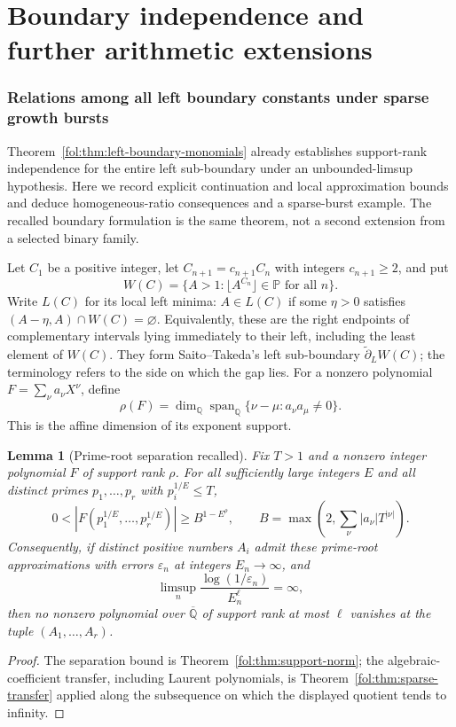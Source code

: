 \documentclass[11pt,a4paper]{article}
\newtheorem{lemma}[theorem]{Lemma}
\theoremstyle{definition}
\theoremstyle{remark}
\numberwithin{equation}{section}
\begin{document}
\part{Boundary independence and further arithmetic extensions}
\label{part:extensions}

\section{Relations among all left boundary constants under sparse growth bursts}
\label{f13:bdsup:section}

Theorem~\ref{fol:thm:left-boundary-monomials} already establishes
support-rank independence for the entire left sub-boundary under an
unbounded-limsup hypothesis. Here we record explicit continuation and
local approximation bounds and deduce homogeneous-ratio consequences
and a sparse-burst example. The recalled boundary formulation is the
same theorem, not a second extension from a selected binary family.

Let $C_1$ be a positive integer, let
$C_{n+1}=c_{n+1}C_n$ with integers $c_{n+1}\ge2$, and put
\[
 W(C)=\{A>1:\lfloor A^{C_n}\rfloor\in\mathbb P\text{ for all }n\}.
\]
Write $L(C)$ for its local left minima: $A\in L(C)$ if some $\eta>0$
satisfies $(A-\eta,A)\cap W(C)=\varnothing$. Equivalently, these are the right endpoints of complementary intervals
lying immediately to their left, including the least element of
$W(C)$. They form Saito--Takeda's left sub-boundary
$\widetilde\partial_L W(C)$; the terminology refers to the side on
which the gap lies.
For a nonzero polynomial $F=\sum_\nu a_\nu X^\nu$, define
\[
 \rho(F)=\dim_{\mathbb Q}\operatorname{span}_{\mathbb Q}
    \{\nu-\mu:a_\nu a_\mu\ne0\}.
\]
This is the affine dimension of its exponent support.

\begin{lemma}[Prime-root separation recalled]\label{f13:bdsup:separation}
Fix $T>1$ and a nonzero integer polynomial $F$ of support rank $\rho$.
For all sufficiently large integers $E$ and all distinct primes
$p_1,\ldots,p_r$ with $p_i^{1/E}\le T$,
\[
 0<|F(p_1^{1/E},\ldots,p_r^{1/E})|
 \ge B^{1-E^\rho},\qquad
 B=\max\left(2,\sum_\nu |a_\nu|T^{|\nu|}\right).
\]
Consequently, if distinct positive numbers $A_i$ admit these prime-root
approximations with errors $\varepsilon_n$ at integers $E_n\to\infty$,
and
\[
 \limsup_n \frac{\log(1/\varepsilon_n)}{E_n^\ell}=\infty,
\]
then no nonzero polynomial over $\overline{\mathbb Q}$ of support rank
at most $\ell$ vanishes at the tuple $(A_1,\ldots,A_r)$.
\end{lemma}
\begin{proof}
The separation bound is Theorem~\ref{fol:thm:support-norm}; the
algebraic-coefficient transfer, including Laurent polynomials, is
Theorem~\ref{fol:thm:sparse-transfer} applied along the subsequence
on which the displayed quotient tends to infinity.
\end{proof}
\end{document}
